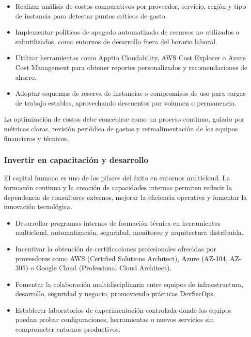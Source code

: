 {                \begin{itemize}
                    \item Realizar análisis de costos comparativos por proveedor, servicio, región y tipo de instancia para detectar puntos críticos de gasto.
                    \item Implementar políticas de apagado automatizado de recursos no utilizados o subutilizados, como entornos de desarrollo fuera del horario laboral.
                    \item Utilizar herramientas como Apptio Cloudability, AWS Cost Explorer o Azure Cost Management para obtener reportes personalizados y recomendaciones de ahorro.
                    \item Adoptar esquemas de reserva de instancias o compromisos de uso para cargas de trabajo estables, aprovechando descuentos por volumen o permanencia.
                \end{itemize}
                
                La optimización de costos debe concebirse como un proceso continuo, guiado por métricas claras, revisión periódica de gastos y retroalimentación de los equipos financieros y técnicos.
                
            \subsubsection{Invertir en capacitación y desarrollo}
                El capital humano es uno de los pilares del éxito en entornos multicloud. La formación continua y la creación de capacidades internas permiten reducir la dependencia de consultores externos, mejorar la eficiencia operativa y fomentar la innovación tecnológica.
                
                \begin{itemize}
                    \item Desarrollar programas internos de formación técnica en herramientas multicloud, automatización, seguridad, monitoreo y arquitectura distribuida.
                    \item Incentivar la obtención de certificaciones profesionales ofrecidas por proveedores como AWS (Certified Solutions Architect), Azure (AZ-104, AZ-305) o Google Cloud (Professional Cloud Architect).
                    \item Fomentar la colaboración multidisciplinaria entre equipos de infraestructura, desarrollo, seguridad y negocio, promoviendo prácticas DevSecOps.
                    \item Establecer laboratorios de experimentación controlada donde los equipos puedan probar configuraciones, herramientas o nuevos servicios sin comprometer entornos productivos.
                \end{itemize}
                
}
